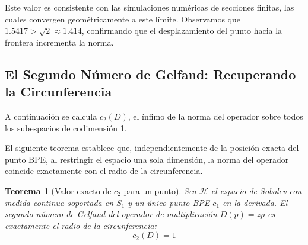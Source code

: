 \documentclass[12pt,a4paper]{article}
\newtheorem{teorema}{Teorema}
\theoremstyle{definition}
\theoremstyle{remark}
\begin{document}
Este valor es consistente con las simulaciones numéricas de secciones finitas, las cuales convergen geométricamente a este límite. Observamos que $1.5417 > \sqrt{2} \approx 1.414$, confirmando que el desplazamiento del punto hacia la frontera incrementa la norma.

\subsection{El Segundo Número de Gelfand: Recuperando la Circunferencia}

A continuación se calcula $c_2(D)$, el ínfimo de la norma del operador sobre todos los subespacios de codimensión 1.

El siguiente teorema establece que, independientemente de la posición exacta del punto BPE, al restringir el espacio una sola dimensión, la norma del operador coincide exactamente con el radio de la circunferencia.

\begin{teorema}[Valor exacto de $c_2$ para un punto]
    Sea $\mathcal{H}$ el espacio de Sobolev con medida continua soportada en $S_1$ y un único punto BPE $c_1$ en la derivada. El segundo número de Gelfand del operador de multiplicación $D(p) = zp$ es exactamente el radio de la circunferencia:
    $$ c_2(D) = 1 $$
\end{teorema}
\end{document}
